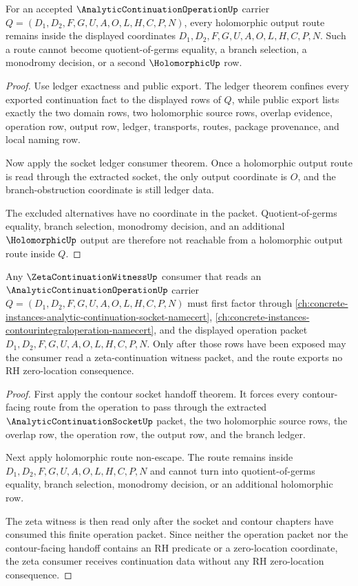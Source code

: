 \begin{theorem}
\label{thm:analytic-continuation-operation-holomorphic-route-nonescape}
For an accepted $\AnalyticContinuationOperationUp$ carrier $Q=(D_1,D_2,F,G,U,A,O,L,H,C,P,N)$, every holomorphic output route remains inside the displayed coordinates $D_1,D_2,F,G,U,A,O,L,H,C,P,N$. Such a route cannot become quotient-of-germs equality, a branch selection, a monodromy decision, or a second $\HolomorphicUp$ row.
\end{theorem}
\begin{proof}
Use ledger exactness and public export. The ledger theorem confines every exported continuation fact to the displayed rows of $Q$, while public export lists exactly the two domain rows, two holomorphic source rows, overlap evidence, operation row, output row, ledger, transports, routes, package provenance, and local naming row.

Now apply the socket ledger consumer theorem. Once a holomorphic output route is read through the extracted socket, the only output coordinate is $O$, and the branch-obstruction coordinate is still ledger data.

The excluded alternatives have no coordinate in the packet. Quotient-of-germs equality, branch selection, monodromy decision, and an additional $\HolomorphicUp$ output are therefore not reachable from a holomorphic output route inside $Q$.
\end{proof}

\begin{theorem}
\label{thm:analytic-continuation-operation-zeta-consumer-boundary}
Any $\ZetaContinuationWitnessUp$ consumer that reads an $\AnalyticContinuationOperationUp$ carrier $Q=(D_1,D_2,F,G,U,A,O,L,H,C,P,N)$ must first factor through \autoref{ch:concrete-instances-analytic-continuation-socket-namecert}, \autoref{ch:concrete-instances-contourintegraloperation-namecert}, and the displayed operation packet $D_1,D_2,F,G,U,A,O,L,H,C,P,N$. Only after those rows have been exposed may the consumer read a zeta-continuation witness packet, and the route exports no RH zero-location consequence.
\end{theorem}
\begin{proof}
First apply the contour socket handoff theorem. It forces every contour-facing route from the operation to pass through the extracted $\AnalyticContinuationSocketUp$ packet, the two holomorphic source rows, the overlap row, the operation row, the output row, and the branch ledger.

Next apply holomorphic route non-escape. The route remains inside $D_1,D_2,F,G,U,A,O,L,H,C,P,N$ and cannot turn into quotient-of-germs equality, branch selection, monodromy decision, or an additional holomorphic row.

The zeta witness is then read only after the socket and contour chapters have consumed this finite operation packet. Since neither the operation packet nor the contour-facing handoff contains an RH predicate or a zero-location coordinate, the zeta consumer receives continuation data without any RH zero-location consequence.
\end{proof}


